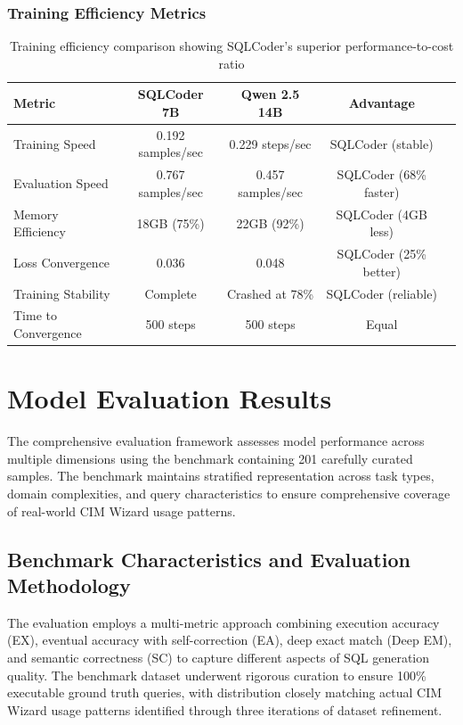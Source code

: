\subsubsection{Training Efficiency Metrics}

\begin{table}%
\centering
\small
\begin{tabular}{lcccc}
\toprule
\textbf{Metric} & \textbf{SQLCoder 7B} & \textbf{Qwen 2.5 14B} & \textbf{Advantage} \\
\midrule
Training Speed & 0.192 samples/sec & 0.229 steps/sec & SQLCoder (stable) \\
Evaluation Speed & 0.767 samples/sec & 0.457 samples/sec & SQLCoder (68\% faster) \\
Memory Efficiency & 18GB (75\%) & 22GB (92\%) & SQLCoder (4GB less) \\
Loss Convergence & 0.036 & 0.048 & SQLCoder (25\% better) \\
Training Stability & Complete & Crashed at 78\% & SQLCoder (reliable) \\
Time to Convergence & 500 steps & 500 steps & Equal \\
\bottomrule
\end{tabular}
\caption{Training efficiency comparison showing SQLCoder's superior performance-to-cost ratio}
\end{table}



\section{Model Evaluation Results}

The comprehensive evaluation framework assesses model performance across multiple dimensions using the benchmark containing 201 carefully curated samples. The benchmark maintains stratified representation across task types, domain complexities, and query characteristics to ensure comprehensive coverage of real-world CIM Wizard usage patterns.

\subsection{Benchmark Characteristics and Evaluation Methodology}

The evaluation employs a multi-metric approach combining execution accuracy (EX), eventual accuracy with self-correction (EA), deep exact match (Deep EM), and semantic correctness (SC) to capture different aspects of SQL generation quality. The benchmark dataset underwent rigorous curation to ensure 100\% executable ground truth queries, with distribution closely matching actual CIM Wizard usage patterns identified through three iterations of dataset refinement.

